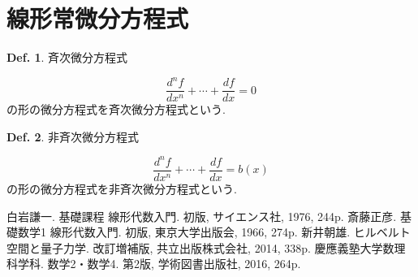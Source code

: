 \documentclass[a4paper,10pt,report]{amsart}
\theoremstyle{plain}
\theoremstyle{definition}
\newtheorem{defn}{Def.}[section]
\theoremstyle{remark}
\begin{document}
\part{線形常微分方程式}
\begin{leftbar}
    \begin{defn}斉次微分方程式\par
        \begin{equation}
            \frac{d^{n}f}{dx^{n}}+\cdots+\frac{df}{dx}=0
        \end{equation}
        の形の微分方程式を斉次微分方程式という. 
    \end{defn}
\end{leftbar}
\begin{leftbar}
    \begin{defn}非斉次微分方程式\par
        \begin{equation}
            \frac{d^{n}f}{dx^{n}}+\cdots+\frac{df}{dx}=b(x)
        \end{equation}
        の形の微分方程式を非斉次微分方程式という. 
    \end{defn}
\end{leftbar}
\begin{thebibliography}{9}
    白岩謙一. 基礎課程 線形代数入門. 初版, サイエンス社, 1976, 244p.
    斎藤正彦. 基礎数学1 線形代数入門. 初版, 東京大学出版会, 1966, 274p.
    新井朝雄. ヒルベルト空間と量子力学. 改訂増補版, 共立出版株式会社, 2014, 338p.
    慶應義塾大学数理科学科. 数学2・数学4. 第2版, 学術図書出版社, 2016, 264p.
\end{thebibliography}
\end{document}
